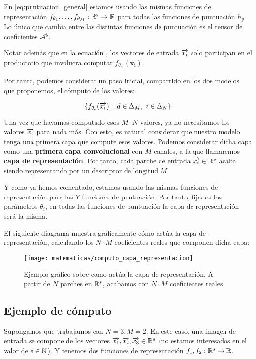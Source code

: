 En \eqref{eq:puntuacion_general} estamos usando las mismas funciones de representación $f_{\theta_1}, \ldots, f_{\theta_M}: \mathbb{R}^s \to \mathbb{R}$ para todas las funciones de puntuación $h_y$. Lo único que cambia entre las distintas funciones de puntuación es el tensor de coeficientes $\mathcal{A}^y$.

Notar además que en la ecuación , los vectores de entrada $\overrightarrow{x_i}$ solo participan en el productorio que involucra computar $f_{\theta_{d_i}}(\mathbf{x_i})$.

Por tanto, podemos considerar un paso inicial, compartido en los dos modelos que proponemos, el cómputo de los valores:

$$\{f_{\theta_d}(\overrightarrow{x_i}): \; d \in \Delta_{M},\ i \in \Delta_{N} \}$$

Una vez que hayamos computado esos $M \cdot N$ valores, ya no necesitamos los valores $\overrightarrow{x_i}$ para nada más. Con esto, es natural considerar que nuestro modelo tenga una primera capa que compute esos valores. Podemos considerar dicha capa como una \textbf{primera capa convolucional} con $M$ canales, a la que llamaremos \textbf{capa de representación}. Por tanto, cada parche de entrada $\overrightarrow{x_i} \in \mathbb{R}^s$ acaba siendo representando por un descriptor de longitud $M$.

Y como ya hemos comentado, estamos usando las mismas funciones de representación para las $Y$ funciones de puntuación. Por tanto, fijados los parámetros $\theta_i$, en todas las funciones de puntuación la capa de representación será la misma.

El siguiente diagrama muestra gráficamente cómo actúa la capa de representación, calculando los $N \cdot M$ coeficientes reales que componen dicha capa:

\begin{figure}[H]
	\centering
	\texttt{[image: matematicas/computo\_capa\_representacion]}
	\caption{Ejemplo gráfico sobre cómo actúa la capa de representación. A partir de $N$ parches en $\mathbb{R}^s$, acabamos con $N \cdot M$ coeficientes reales}
\end{figure}


\subsection{Ejemplo de cómputo} \label{ejemplo:funcion_puntuacion}

Supongamos que trabajamos con $N = 3, M = 2$. En este caso, una imagen de entrada se compone de los vectores $\overrightarrow{x_1}, \overrightarrow{x_2}, \overrightarrow{x_3} \in \mathbb{R}^s$ (no estamos interesados en el valor de $s \in \mathbb{N}$). Y tenemos dos funciones de representación $f_1, f_2: \mathbb{R}^s \to \mathbb{R}$.

